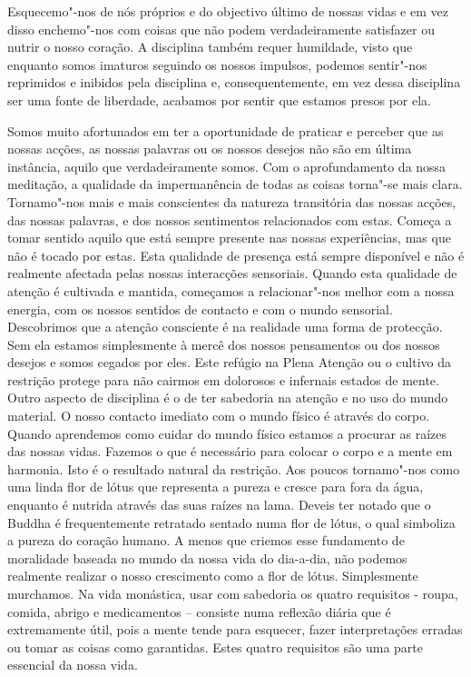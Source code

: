 Esquecemo"-nos de nós próprios e do objectivo último de nossas vidas e em
vez disso enchemo"-nos com coisas que não podem verdadeiramente
satisfazer ou nutrir o nosso coração. A disciplina também requer
humildade, visto que enquanto somos imaturos seguindo os nossos
impulsos, podemos sentir"-nos reprimidos e inibidos pela disciplina e,
consequentemente, em vez dessa disciplina ser uma fonte de liberdade,
acabamos por sentir que estamos presos por ela.

Somos muito afortunados em ter a oportunidade de praticar e perceber que
as nossas acções, as nossas palavras ou os nossos desejos não são em
última instância, aquilo que verdadeiramente somos. Com o aprofundamento
da nossa meditação, a qualidade da impermanência de todas as coisas
torna"-se mais clara. Tornamo"-nos mais e mais conscientes da natureza
transitória das nossas acções, das nossas palavras, e dos nossos
sentimentos relacionados com estas. Começa a tomar sentido aquilo que
está sempre presente nas nossas experiências, mas que não é tocado por
estas. Esta qualidade de presença está sempre disponível e não é
realmente afectada pelas nossas interacções sensoriais. Quando esta
qualidade de atenção é cultivada e mantida, começamos a relacionar"-nos
melhor com a nossa energia, com os nossos sentidos de contacto e com o
mundo sensorial. Descobrimos que a atenção consciente é na realidade uma
forma de protecção. Sem ela estamos simplesmente à mercê dos nossos
pensamentos ou dos nossos desejos e somos cegados por eles. Este refúgio
na Plena Atenção ou o cultivo da restrição protege para não cairmos em
dolorosos e infernais estados de mente. Outro aspecto de disciplina é o
de ter sabedoria na atenção e no uso do mundo material. O nosso contacto
imediato com o mundo físico é através do corpo. Quando aprendemos como
cuidar do mundo físico estamos a procurar as raízes das nossas vidas.
Fazemos o que é necessário para colocar o corpo e a mente em harmonia.
Isto é o resultado natural da restrição. Aos poucos tornamo"-nos como uma
linda flor de lótus que representa a pureza e cresce para fora da água,
enquanto é nutrida através das suas raízes na lama. Deveis ter notado
que o Buddha é frequentemente retratado sentado numa flor de lótus, o
qual simboliza a pureza do coração humano. A menos que criemos esse
fundamento de moralidade baseada no mundo da nossa vida do dia-a-dia,
não podemos realmente realizar o nosso crescimento como a flor de lótus.
Simplesmente murchamos. Na vida monástica, usar com sabedoria os quatro
requisitos - roupa, comida, abrigo e medicamentos -- consiste numa
reflexão diária que é extremamente útil, pois a mente tende para
esquecer, fazer interpretações erradas ou tomar as coisas como
garantidas. Estes quatro requisitos são uma parte essencial da nossa
vida.

